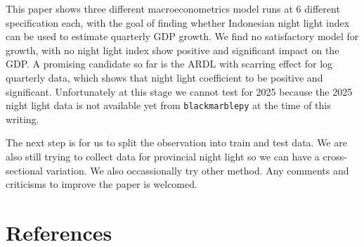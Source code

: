 \documentclass[
]{interact}
\begin{document}
This paper shows three different macroeconometrics model runs at 6
different specification each, with the goal of finding whether
Indonesian night light index can be used to estimate quarterly GDP
growth. We find no satisfactory model for growth, with no night light
index show positive and significant impact on the GDP. A promising
candidate so far is the ARDL with scarring effect for log quarterly
data, which shows that night light coefficient to be positive and
significant. Unfortunately at this stage we cannot test for 2025 because
the 2025 night light data is not available yet from
\texttt{blackmarblepy} at the time of this writing.

The next step is for us to split the observation into train and test
data. We are also still trying to collect data for provincial night
light so we can have a cross-sectional variation. We also occassionally
try other method. Any comments and criticisms to improve the paper is
welcomed.

\section*{References}\label{references}
\end{document}

